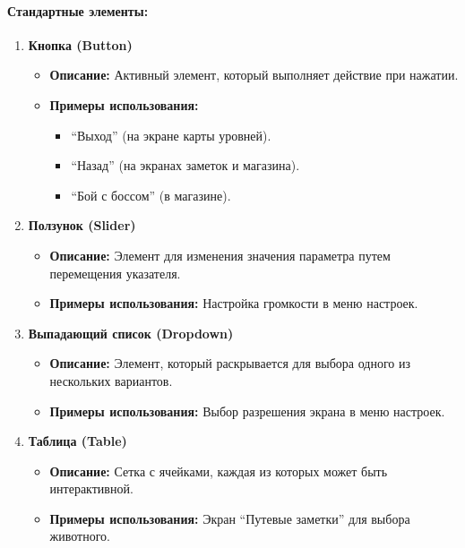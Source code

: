 \documentclass{article}
\begin{document}
\paragraph{Стандартные элементы:}
\begin{enumerate}
    \item \textbf{Кнопка (Button)}
    \begin{itemize}
        \item \textbf{Описание:} Активный элемент, который выполняет действие при нажатии.
        \item \textbf{Примеры использования:}
        \begin{itemize}
            \item ``Выход'' (на экране карты уровней).
            \item ``Назад'' (на экранах заметок и магазина).
            \item ``Бой с боссом'' (в магазине).
        \end{itemize}
    \end{itemize}

    \item \textbf{Ползунок (Slider)}
    \begin{itemize}
        \item \textbf{Описание:} Элемент для изменения значения параметра путем перемещения указателя.
        \item \textbf{Примеры использования:} Настройка громкости в меню настроек.
    \end{itemize}

    \item \textbf{Выпадающий список (Dropdown)}
    \begin{itemize}
        \item \textbf{Описание:} Элемент, который раскрывается для выбора одного из нескольких вариантов.
        \item \textbf{Примеры использования:} Выбор разрешения экрана в меню настроек.
    \end{itemize}

    \item \textbf{Таблица (Table)}
    \begin{itemize}
        \item \textbf{Описание:} Сетка с ячейками, каждая из которых может быть интерактивной.
        \item \textbf{Примеры использования:} Экран ``Путевые заметки'' для выбора животного.
    \end{itemize}
\end{enumerate}
\end{document}
